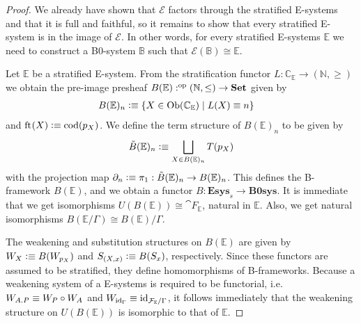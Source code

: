 \begin{proof}
We already have shown that $\mathcal{E}$ factors through the stratified
E-systems and that it is full and faithful, so it remains
to show that every stratified E-system is in the image of $\mathcal{E}$. In
other words, for every stratified E-systems $\mathbb{E}$ we need to construct
a B0-system $\mathbb{B}$ such that $\mathcal{E}(\mathbb{B})\cong\mathbb{E}$. 

Let $\mathbb{E}$ be a stratified E-system. From the stratification functor
$L:\mathbb{C}_{\mathbb{E}}\to (\mathbb{N},\geq)$ we obtain the pre-image
presheaf $B(\mathbb{E}):\op{(\mathbb{N},\leq)}\to\mathbf{Set}$ given by
\begin{align*}
B(\mathbb{E})_n & \defeq \{X\in\mathrm{Ob}(\mathbb{C}_{\mathbb{E}})\mid L(X)\jdeq n\}
\end{align*}
and $\eft(X)\defeq\mathrm{cod}(p_X)$. We define the term structure of $B(\mathbb{E})_n$
to be given by
\begin{equation*}
\tilde{B}(\mathbb{E})_n \defeq \bigsqcup_{X\in B(\mathbb{E})_n} T(p_X)
\end{equation*}
with the projection map $\ebd[n]\defeq\pi_1:\tilde{B}(\mathbb{E})_n\to B(\mathbb{E})_n$.
This defines the B-framework $B(\mathbb{E})$, and we obtain a functor
$B:\mathbf{Esys}_s\to\mathbf{B0sys}$. It is immediate that we get isomorphisms
$U(B(\mathbb{E}))\cong\cat{F}_{\mathbb{E}}$, natural in $\mathbb{E}$. Also, we
get natural isomorphisms $B(\mathbb{E}/\Gamma)\cong B(\mathbb{E})/\Gamma$. 

The weakening and substitution structures on
$B(\mathbb{E})$ are given by $W_X\defeq B(W_{p_X})$ and $S_{(X,x)}\defeq B(S_x)$,
respectively. Since these functors are assumed to be stratified, they define
homomorphisms of B-frameworks. Because a weakening system of a E-systems is
required to be functorial, i.e.~$W_{\ctxext{A}{P}}\jdeq W_P\circ W_A$ and
$W_{\catid{\Gamma}}\jdeq\catid{\cat{F}_{\mathbb{E}}/\Gamma}$, it follows
immediately that the weakening structure on $U(B(\mathbb{E}))$ is isomorphic to
that of $\mathbb{E}$. 
\end{proof}

